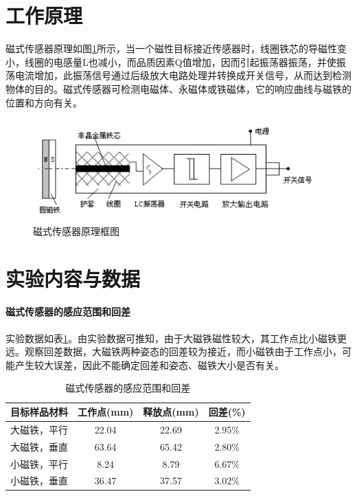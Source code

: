 	\section{工作原理}
	磁式传感器原理如图\ref{fig:ms}所示，当一个磁性目标接近传感器时，线圈铁芯的导磁性变小，线圈的电感量L也减小，而品质因素Q值增加，因而引起振荡器振荡，并使振荡电流增加，此振荡信号通过后级放大电路处理并转换成开关信号，从而达到检测物体的目的。磁式传感器可检测电磁体、永磁体或铁磁体，它的响应曲线与磁铁的位置和方向有关。
	\begin{figure}[htbp]
	\centering
	\includegraphics[width=11cm]{resource/megnet_sensor.png}
	\caption{磁式传感器原理框图}
	\label{fig:ms}
	\end{figure}

	\section{实验内容与数据}
	\paragraph{磁式传感器的感应范围和回差}
	实验数据如表\ref{tab:mrr}。由实验数据可推知，由于大磁铁磁性较大，其工作点比小磁铁更远。观察回差数据，大磁铁两种姿态的回差较为接近，而小磁铁由于工作点小，可能产生较大误差，因此不能确定回差和姿态、磁铁大小是否有关。
	\begin{table}[htbp]
		\centering
		\begin{tabular}{|c|c|c|c|}
			\hline
			目标样品材料 & 工作点(mm) & 释放点(mm) & 回差(\%) \\
			\hline
			大磁铁，平行 & 22.04 & 22.69 & 2.95\% \\
			大磁铁，垂直 & 63.64 & 65.42 & 2.80\% \\
			小磁铁，平行 & 8.24 & 8.79 & 6.67\% \\
			小磁铁，垂直 & 36.47 & 37.57 & 3.02\% \\
			\hline
		\end{tabular}
		\caption{磁式传感器的感应范围和回差}
		\label{tab:mrr}
	\end{table}

